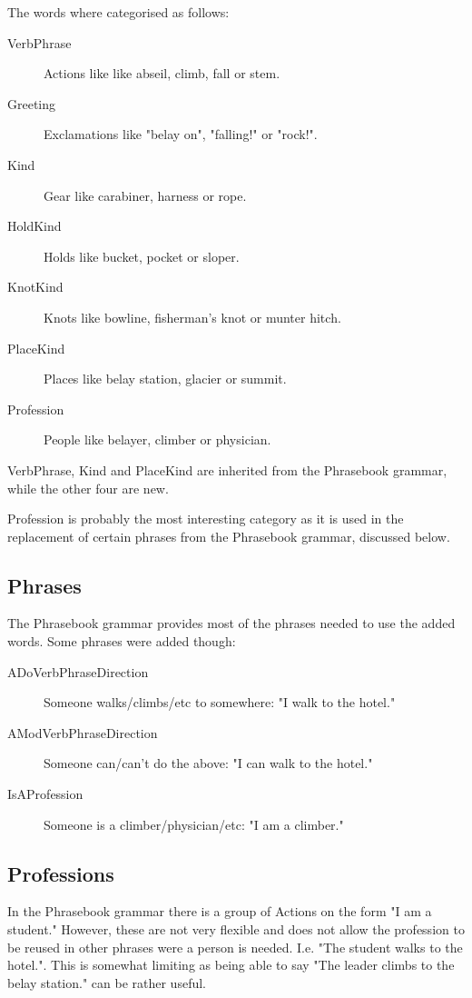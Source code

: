 The words where categorised as follows:
\begin{description}
\item[VerbPhrase] Actions like like abseil, climb, fall or stem.
\item[Greeting] Exclamations like "belay on", "falling!" or "rock!".
\item[Kind] Gear like carabiner, harness or rope.
\item[HoldKind] Holds like bucket, pocket or sloper.
\item[KnotKind] Knots like bowline, fisherman's knot or munter hitch.
\item[PlaceKind] Places like belay station, glacier or summit.
\item[Profession] People like belayer, climber or physician.
\end{description}
VerbPhrase, Kind and PlaceKind are inherited from the Phrasebook grammar, while the other four are new.

Profession is probably the most interesting category as it is used in the replacement of certain phrases from the Phrasebook grammar, discussed below.


\subsection{Phrases}
The Phrasebook grammar provides most of the phrases needed to use the added words. Some phrases were added though:
\begin{description}
\item[ADoVerbPhraseDirection] Someone walks/climbs/etc to somewhere: "I walk to the hotel."
\item[AModVerbPhraseDirection] Someone can/can't do the above: "I can walk to the hotel."
\item[IsAProfession] Someone is a climber/physician/etc: "I am a climber."
\end{description}


\subsection{Professions}
In the Phrasebook grammar there is a group of Actions on the form "I am a student." However, these are not very flexible and does not allow the profession to be reused in other phrases were a person is needed. I.e. "The student walks to the hotel.".
This is somewhat limiting as being able to say "The leader climbs to the belay station." can be rather useful.

